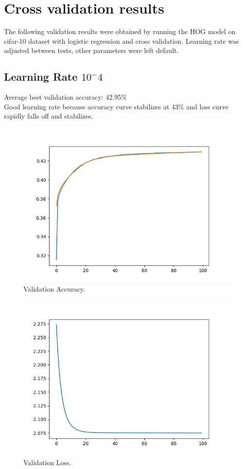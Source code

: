 \documentclass[12pt, letter]{article}
\begin{document}
{\pagebreak


\section{Cross validation results}
The following validation results were obtained by running the HOG model on
cifar-10 dataset with logistic regression and cross validation. Learning rate
was adjusted between tests, other parameters were left default.
\subsection{Learning Rate $10^-4$}
Average best validation accuracy: 42.95\% \\
Good learning rate because accuracy curve stabilizes at 43\% and loss curve
rapidly falls off and stabilizes.
\begin{figure}[h]
  \centering
  \includegraphics[scale=0.60]{hog_logreg_cv_lre4_acc}
  \caption{Validation Accuracy.}
  \label{fig:eg}
\end{figure}
\begin{figure}[h]
  \centering
  \includegraphics[scale=0.60]{hog_logreg_cv_lre4_loss}
  \caption{Validation Loss.}
  \label{fig:eg}
\end{figure}
\pagebreak

}
\end{document}

